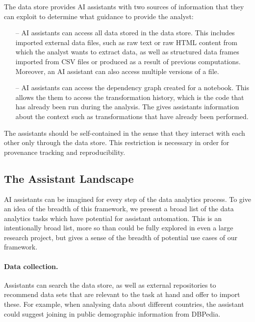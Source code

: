 \documentclass[sigplan,preprint,10pt]{acmart}\settopmatter{printfolios=true,printccs=false,printacmref=false}
\theoremstyle{plain}
\theoremstyle{definition}
\begin{document}
{The data store provides AI assistants with
two sources of information that they can exploit
to determine what guidance to provide the analyst:
%
\begin{itemize}
\item[--] AI assistants can access all data stored in the data
store. This includes imported external data files, such as raw text or raw HTML content from which
the analyst wants to extract data, as well as structured data frames imported from CSV files or
produced as a result of previous computations. Moreover, an AI assistant can also access multiple
versions of a file.

\item[--] AI assistants can access the dependency graph created for a
notebook. This allows the them to access the transformation history, which is the code
that has already been run during the analysis. The gives assistants information about the
context such as transformations that have already been performed.
\end{itemize}

\medskip \noindent
The assistants should be self-contained in the sense that they interact with each other
only through the
data store. This restriction is necessary in order
for provenance tracking and reproducibility.



\subsection{The Assistant Landscape}
{

AI assistants can be imagined for every step of the data analytics process.
To give an idea of the breadth of this framework,
we present a broad list of the data analytics tasks which have potential for assistant automation.
This is an intentionally broad list, more so than
could be fully explored in even a large research project, but gives a sense of the breadth of
potential use cases of our framework.

\paragraph{Data collection.} Assistants can search the data store, as well as external repositories
to recommend data sets that are relevant to the task at hand and offer to import these. For example,
when analysing data about different countries,
the assistant could suggest joining in public
demographic information from DBPedia.

}}
\end{document}
